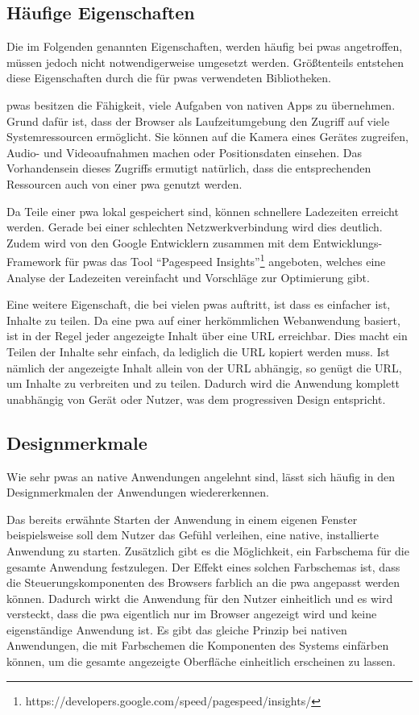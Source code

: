 \documentclass[12pt, parskip=half]{scrartcl}       %
\begin{document}
\subsection{Häufige Eigenschaften}

Die im Folgenden genannten Eigenschaften, werden häufig bei \acp{pwa} angetroffen, müssen jedoch nicht notwendigerweise umgesetzt werden.
Größtenteils entstehen diese Eigenschaften durch die für \acp{pwa} verwendeten Bibliotheken.

\acp{pwa} besitzen die Fähigkeit, viele Aufgaben von nativen Apps zu übernehmen.
Grund dafür ist, dass der Browser als Laufzeitumgebung den Zugriff auf viele Systemressourcen ermöglicht.
Sie können auf die Kamera eines Gerätes zugreifen, Audio- und Videoaufnahmen machen oder Positionsdaten einsehen.
Das Vorhandensein dieses Zugriffs ermutigt natürlich, dass die entsprechenden Ressourcen auch von einer \ac{pwa} genutzt werden.

Da Teile einer \ac{pwa} lokal gespeichert sind, können schnellere Ladezeiten erreicht werden.
Gerade bei einer schlechten Netzwerkverbindung wird dies deutlich.
Zudem wird von den Google Entwicklern zusammen mit dem Entwicklungs-Framework für \acp{pwa} das Tool \enquote{Pagespeed Insights}\footnote{https://developers.google.com/speed/pagespeed/insights/} angeboten, welches eine Analyse der Ladezeiten vereinfacht und Vorschläge zur Optimierung gibt.

Eine weitere Eigenschaft, die bei vielen \acp{pwa} auftritt, ist dass es einfacher ist, Inhalte zu teilen.
Da eine \ac{pwa} auf einer herkömmlichen Webanwendung basiert, ist in der Regel jeder angezeigte Inhalt über eine URL erreichbar.
Dies macht ein Teilen der Inhalte sehr einfach, da lediglich die URL kopiert werden muss.
Ist nämlich der angezeigte Inhalt allein von der URL abhängig, so genügt die URL, um Inhalte zu verbreiten und zu teilen.
Dadurch wird die Anwendung komplett unabhängig von Gerät oder Nutzer, was dem progressiven Design entspricht.


\subsection{Designmerkmale}

Wie sehr \acp{pwa} an native Anwendungen angelehnt sind, lässt sich häufig in den Designmerkmalen der Anwendungen wiedererkennen.

Das bereits erwähnte Starten der Anwendung in einem eigenen Fenster beispielsweise soll dem Nutzer das Gefühl verleihen, eine native, installierte Anwendung zu starten.
Zusätzlich gibt es die Möglichkeit, ein Farbschema für die gesamte Anwendung festzulegen.
Der Effekt eines solchen Farbschemas ist, dass die Steuerungskomponenten des Browsers farblich an die \ac{pwa} angepasst werden können.
Dadurch wirkt die Anwendung für den Nutzer einheitlich und es wird versteckt, dass die \ac{pwa} eigentlich nur im Browser angezeigt wird und keine eigenständige Anwendung ist.
Es gibt das gleiche Prinzip bei nativen Anwendungen, die mit Farbschemen die Komponenten des Systems einfärben können, um die gesamte angezeigte Oberfläche einheitlich erscheinen zu lassen.
\end{document}
